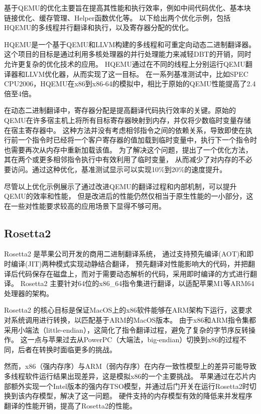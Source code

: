 基于QEMU的优化主要旨在提高其性能和执行效率，例如中间代码优化\cite{LiNan2021}、基本块链接优化\cite{Hong2012HQEMUAM}、缓存管理\cite{FengYue2010}、Helper函数优化\cite{Wang2021}等。
以下给出两个优化示例，包括HQEMU的多线程并行翻译和执行，以及寄存器分配的优化。

HQEMU\cite{Hong2012HQEMUAM}是一个基于QEMU和LLVM构建的多线程和可重定向动态二进制翻译器。
这个项目的目标是通过利用多核处理器的并行处理能力来减轻DBT的开销，同时允许更复杂的优化技术的应用。
HQEMU通过在不同的线程上分别运行QEMU翻译器和LLVM优化器，从而实现了这一目标。
在一系列基准测试中，比如SPEC CPU2006，HQEMU在x86到x86-64的模拟中，相比于原始的QEMU性能提高了2.4倍至4倍。

在动态二进制翻译中，寄存器分配是提高翻译代码执行效率的关键。原始的QEMU在许多宿主机上将所有目标寄存器映射到内存，并仅将少数临时变量存储在宿主寄存器中。
这种方法并没有考虑相邻指令之间的依赖关系，导致即使在执行前一个指令时已经将一个客户寄存器的值加载到临时变量中，执行下一个指令时也需要再次从内存中重新加载该值。
为了解决这个问题，\cite{Hong2012HQEMUAM}提出了一个优化方法，其在两个或更多相邻指令执行中有效利用了临时变量，
从而减少了对内存的不必要访问。通过这种优化，基准测试显示可以实现10\%到20\%的速度提升。

尽管以上优化示例展示了通过改进QEMU的翻译过程和内部机制，可以提升QEMU的效率和性能，
但是改进后的性能仍然仅相当于原生性能的一小部分，这在一些对性能要求较高的应用场景下显得不够可用。


\subsection{Rosetta2}

Rosetta2 是苹果公司开发的商用二进制翻译系统，
通过支持预先编译(AOT)和即时编译(JIT)两种模式实现动静结合翻译，
预先翻译对性能影响大的代码，并把翻译后代码保存在磁盘上，而对于需要动态解析的代码，采用即时编译的方式进行翻译。
Rosetta2 主要针对64位的x86\_64指令集进行翻译，以适配苹果M1等ARM64处理器的架构。

Rosetta2 的核心目标是保证MacOS上的x86软件能够在ARM架构下运行，这要求对系统调用进行转换，以匹配基于ARM的MacOS版本。
由于x86和ARM指令集都采用小端法（little-endian），这简化了指令翻译过程，避免了复杂的字节序反转操作。
这一点与苹果过去从PowerPC（大端法，big-endian）切换到x86的过程不同，后者在转换时面临更多的挑战。

然而，x86（强内存序）与ARM（弱内存序）在内存一致性模型上的差异可能导致多线程软件运行结果出现差异，这是模拟x86的一个主要挑战\cite{Risotto}。
苹果通过在芯片内部额外实现一个Intel版本的强内存TSO模型，并通过后门开关在运行Rosetta2时切换到该内存模型，解决了这一问题。
硬件支持的内存模型有效的降低来并发程序翻译的性能开销，提高了Rosetta2的性能。

